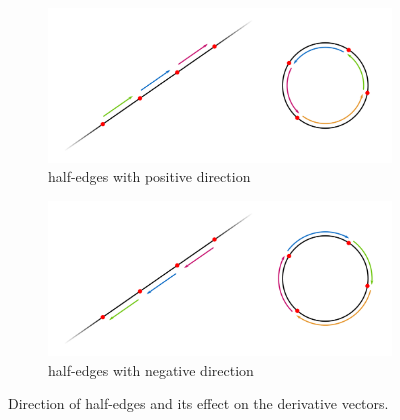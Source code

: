 \begin{figure}%
  \centering
  \begin{subfigure}{.8\textwidth}
    \includegraphics[width=\textwidth]{figures/appa_derDirection_pos.png}
    \caption{half-edges with positive direction} \label{subfig:appa_derDirection_pos}
  \end{subfigure}

  \begin{subfigure}{.8\textwidth}
    \includegraphics[width=\textwidth]{figures/appa_derDirection_neg.png}
    \caption{half-edges with negative direction} \label{subfig:appa_derDirection_neg}
  \end{subfigure}
  \caption[xxx]
          {Direction of half-edges and its effect on the derivative vectors.}
  \label{fig:appa_derDirection}
\end{figure}



